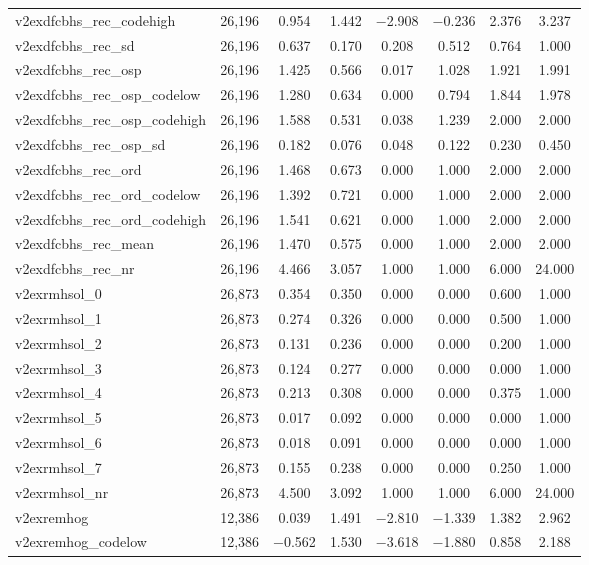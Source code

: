 \begin{table}[!htbp]
\begin{tabular}{@{\extracolsep{5pt}}lccccccc}
v2exdfcbhs\_rec\_codehigh & 26,196 & 0.954 & 1.442 & $-$2.908 & $-$0.236 & 2.376 & 3.237 \\ 
v2exdfcbhs\_rec\_sd & 26,196 & 0.637 & 0.170 & 0.208 & 0.512 & 0.764 & 1.000 \\ 
v2exdfcbhs\_rec\_osp & 26,196 & 1.425 & 0.566 & 0.017 & 1.028 & 1.921 & 1.991 \\ 
v2exdfcbhs\_rec\_osp\_codelow & 26,196 & 1.280 & 0.634 & 0.000 & 0.794 & 1.844 & 1.978 \\ 
v2exdfcbhs\_rec\_osp\_codehigh & 26,196 & 1.588 & 0.531 & 0.038 & 1.239 & 2.000 & 2.000 \\ 
v2exdfcbhs\_rec\_osp\_sd & 26,196 & 0.182 & 0.076 & 0.048 & 0.122 & 0.230 & 0.450 \\ 
v2exdfcbhs\_rec\_ord & 26,196 & 1.468 & 0.673 & 0.000 & 1.000 & 2.000 & 2.000 \\ 
v2exdfcbhs\_rec\_ord\_codelow & 26,196 & 1.392 & 0.721 & 0.000 & 1.000 & 2.000 & 2.000 \\ 
v2exdfcbhs\_rec\_ord\_codehigh & 26,196 & 1.541 & 0.621 & 0.000 & 1.000 & 2.000 & 2.000 \\ 
v2exdfcbhs\_rec\_mean & 26,196 & 1.470 & 0.575 & 0.000 & 1.000 & 2.000 & 2.000 \\ 
v2exdfcbhs\_rec\_nr & 26,196 & 4.466 & 3.057 & 1.000 & 1.000 & 6.000 & 24.000 \\ 
v2exrmhsol\_0 & 26,873 & 0.354 & 0.350 & 0.000 & 0.000 & 0.600 & 1.000 \\ 
v2exrmhsol\_1 & 26,873 & 0.274 & 0.326 & 0.000 & 0.000 & 0.500 & 1.000 \\ 
v2exrmhsol\_2 & 26,873 & 0.131 & 0.236 & 0.000 & 0.000 & 0.200 & 1.000 \\ 
v2exrmhsol\_3 & 26,873 & 0.124 & 0.277 & 0.000 & 0.000 & 0.000 & 1.000 \\ 
v2exrmhsol\_4 & 26,873 & 0.213 & 0.308 & 0.000 & 0.000 & 0.375 & 1.000 \\ 
v2exrmhsol\_5 & 26,873 & 0.017 & 0.092 & 0.000 & 0.000 & 0.000 & 1.000 \\ 
v2exrmhsol\_6 & 26,873 & 0.018 & 0.091 & 0.000 & 0.000 & 0.000 & 1.000 \\ 
v2exrmhsol\_7 & 26,873 & 0.155 & 0.238 & 0.000 & 0.000 & 0.250 & 1.000 \\ 
v2exrmhsol\_nr & 26,873 & 4.500 & 3.092 & 1.000 & 1.000 & 6.000 & 24.000 \\ 
v2exremhog & 12,386 & 0.039 & 1.491 & $-$2.810 & $-$1.339 & 1.382 & 2.962 \\ 
v2exremhog\_codelow & 12,386 & $-$0.562 & 1.530 & $-$3.618 & $-$1.880 & 0.858 & 2.188 \\ 

\end{tabular}
\end{table}
